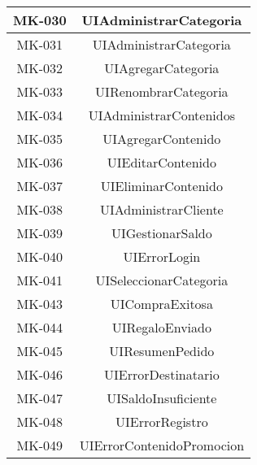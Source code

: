 \begin{longtable}{|c|c|}
MK-030 & UIAdministrarCategoria \\
\hline

MK-031 & UIAdministrarCategoria \\
\hline

MK-032 & UIAgregarCategoria \\
\hline

MK-033 & UIRenombrarCategoria \\
\hline

MK-034 & UIAdministrarContenidos \\
\hline

MK-035 & UIAgregarContenido  \\
\hline

MK-036 & UIEditarContenido  \\
\hline

MK-037 & UIEliminarContenido  \\
\hline

MK-038 & UIAdministrarCliente  \\
\hline

MK-039 & UIGestionarSaldo  \\
\hline

MK-040 & UIErrorLogin \\
\hline

MK-041 & UISeleccionarCategoria  \\
\hline

MK-043 & UICompraExitosa  \\
\hline

MK-044 & UIRegaloEnviado  \\
\hline

MK-045 & UIResumenPedido  \\
\hline

MK-046 & UIErrorDestinatario  \\
\hline

MK-047 & UISaldoInsuficiente  \\
\hline

MK-048 & UIErrorRegistro  \\
\hline

MK-049 & UIErrorContenidoPromocion  \\
\hline


\end{longtable}
